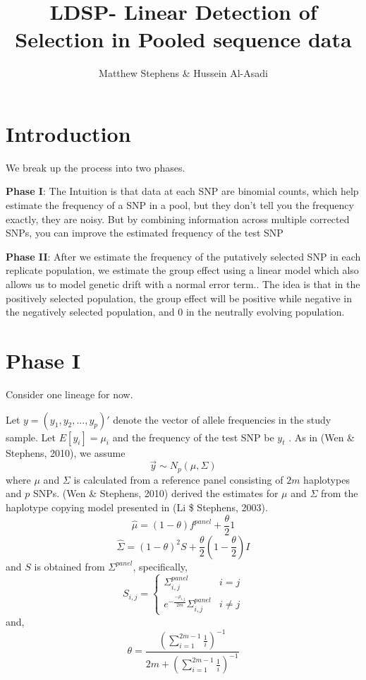 \documentclass[10pt,a4paper,draft]{article}
\title{LDSP- Linear Detection of Selection in Pooled sequence data}
\date{}
\author{Matthew Stephens \& Hussein Al-Asadi}
\begin{document}
\maketitle
\section{Introduction}
We break up the process into two phases.

\textbf{Phase I}:
The Intuition is that data at each SNP are binomial counts, which help estimate the frequency of a SNP in a pool, but they don't
tell you the frequency exactly, they are noisy. But by combining information across multiple corrected SNPs, you can improve the estimated frequency of the test SNP

\textbf{Phase II}:
After we estimate the frequency of the putatively selected SNP in each replicate population, we estimate the group effect using a linear model which also allows us to model genetic drift with a normal error term.. The idea is that in the positively selected population, the group effect will be positive while negative in the negatively selected population, and 0 in the neutrally evolving population.

\section{Phase I}
Consider one lineage for now.

Let  $y = (y_1, y_2, ..., y_p)'$ denote the vector of allele frequencies in the study sample.
Let $E[y_{i}] = \mu_{i}$ and the frequency of the test SNP be $y_{t}$ . As in (Wen \& Stephens, 2010), we assume 
\begin{equation}
\vec{y} \sim N_p(\mu, \Sigma) \label{eq:prior}
\end{equation}
where $\mu$ and $\Sigma$ is calculated from a reference panel consisting of $2m$ haplotypes and $p$ SNPs. (Wen \& Stephens, 2010) derived the estimates for $\mu$ and $\Sigma$ from the haplotype copying model presented in (Li \$ Stephens, 2003).
\begin{equation}
\hat{\mu} = (1-\theta)f^{panel} + \frac{\theta}{2}1 
\end{equation}
\begin{equation}
\hat{\Sigma} = (1-\theta)^2S + \frac{\theta}{2}(1-\frac{\theta}{2})I
\end{equation}
and $S$ is obtained from $\Sigma^{panel}$, specifically,
 \begin{equation}
   S_{i,j} = \left\{
     \begin{array}{lr}
       \Sigma_{i,j}^{panel} &  i =j\\
       e^{-\frac{-\rho_{i,j}}{2m}} \Sigma_{i,j}^{panel} &  i \neq j
     \end{array}
   \right.
\end{equation} 
and,
\begin{equation}
\theta = \frac{(\sum_{i=1}^{2m-1} \frac{1}{i})^{-1}}{2m + (\sum_{i=1}^{2m-1} \frac{1}{i})^{-1}}
\end{equation}
\end{document}
